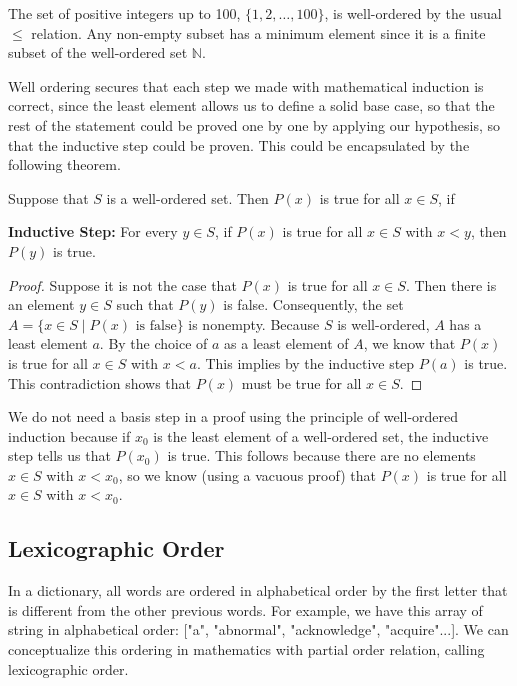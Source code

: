 \begin{example}
	The set of positive integers up to 100, \( \{1, 2, \ldots, 100\} \), is well-ordered by the usual \( \leq \) relation. Any non-empty subset has a minimum element since it is a finite subset of the well-ordered set \( \mathbb{N} \).
\end{example}

Well ordering secures that each step we made with mathematical induction is correct, since the least element allows us to define a solid base case, so that the rest of the statement could be proved one by one by applying our hypothesis, so that the inductive step could be proven. This could be encapsulated by the following theorem.
\begin{theorem}
	Suppose that \( S \) is a well-ordered set. Then \( P(x) \) is true for all \( x \in S \), if

		\textbf{Inductive Step:} For every \( y \in S \), if \( P(x) \) is true for all \( x \in S \) with \( x < y \), then \( P(y) \) is true.

\end{theorem}

\begin{proof}
	Suppose it is not the case that \( P(x) \) is true for all \( x \in S \). Then there is an element \( y \in S \) such that \( P(y) \) is false. Consequently, the set \( A = \{ x \in S \mid P(x) \text{ is false} \} \) is nonempty. Because \( S \) is well-ordered, \( A \) has a least element \( a \). By the choice of \( a \) as a least element of \( A \), we know that \( P(x) \) is true for all \( x \in S \) with \( x < a \). This implies by the inductive step \( P(a) \) is true. This contradiction shows that \( P(x) \) must be true for all \( x \in S \).
\end{proof}

\begin{remark}
	We do not need a basis step in a proof using the principle of well-ordered induction because if \( x_0 \) is the least element of a well-ordered set, the inductive step tells us that \( P(x_0) \) is true. This follows because there are no elements \( x \in S \) with \( x < x_0 \), so we know (using a vacuous proof) that \( P(x) \) is true for all \( x \in S \) with \( x < x_0 \).
\end{remark}

\subsection{Lexicographic Order}
In a dictionary, all words are ordered in alphabetical order by the first letter that is different from the other previous words. For example, we have this array of string in alphabetical order: ["a", "abnormal", "acknowledge", "acquire"...]. We can conceptualize this ordering in mathematics with partial order relation, calling lexicographic order. 


